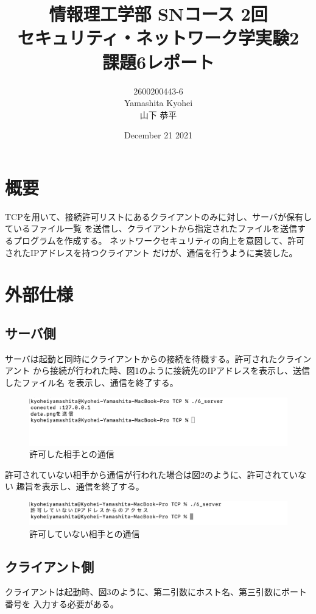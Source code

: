 \documentclass[dvipdfmx,autodetect-engine,titlepage]{jsarticle}
\title{情報理工学部 SNコース 2回\\
セキュリティ・ネットワーク学実験2\\
課題6レポート}
\author{2600200443-6\\Yamashita Kyohei\\山下 恭平}
\date{December 21 2021}
\begin{document}
\maketitle

\section{概要}
TCPを用いて、接続許可リストにあるクライアントのみに対し、サーバが保有しているファイル一覧
を送信し、クライアントから指定されたファイルを送信するプログラムを作成する。
ネットワークセキュリティの向上を意図して、許可されたIPアドレスを持つクライアント
だけが、通信を行うように実装した。

\section{外部仕様}

\subsection{サーバ側}
サーバは起動と同時にクライアントからの接続を待機する。許可されたクラインアント
から接続が行われた時、図1のように接続先のIPアドレスを表示し、送信したファイル名
を表示し、通信を終了する。

\begin{figure}[h]
    \centering
    \includegraphics[scale=1]{pic3.png}
    \caption{許可した相手との通信}
\end{figure}

許可されていない相手から通信が行われた場合は図2のように、許可されていない
趣旨を表示し、通信を終了する。

\begin{figure}[h]
    \centering
    \includegraphics[scale=1]{pic5.png}
    \caption{許可していない相手との通信}
\end{figure}

\subsection{クライアント側}
クライアントは起動時、図3のように、第二引数にホスト名、第三引数にポート番号を
入力する必要がある。
\end{document}
